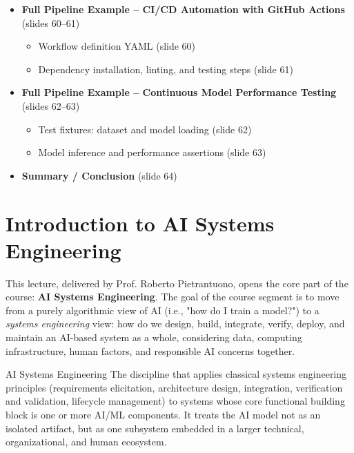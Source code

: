 \begin{itemize}
\begin{itemize}
        \item Ops lifecycle activities: releasing, deploying, monitoring (slide 59)
    \end{itemize}
    \item \textbf{Full Pipeline Example -- CI/CD Automation with GitHub Actions} (slides 60--61)
    \begin{itemize}
        \item Workflow definition YAML (slide 60)
        \item Dependency installation, linting, and testing steps (slide 61)
    \end{itemize}
    \item \textbf{Full Pipeline Example -- Continuous Model Performance Testing} (slides 62--63)
    \begin{itemize}
        \item Test fixtures: dataset and model loading (slide 62)
        \item Model inference and performance assertions (slide 63)
    \end{itemize}
    \item \textbf{Summary / Conclusion} (slide 64)
\end{itemize}

\pagebreak

\section{Introduction to AI Systems Engineering}



This lecture, delivered by Prof. Roberto Pietrantuono, opens the core part of the course: \textbf{AI Systems Engineering}. The goal of the course segment is to move from a purely algorithmic view of AI (i.e., "how do I train a model?") to a \emph{systems engineering} view: how do we design, build, integrate, verify, deploy, and maintain an AI-based system as a whole, considering data, computing infrastructure, human factors, and responsible AI concerns together.

\begin{defbox}{AI Systems Engineering}
The discipline that applies classical systems engineering principles (requirements elicitation, architecture design, integration, verification and validation, lifecycle management) to systems whose core functional building block is one or more AI/ML components. It treats the AI model not as an isolated artifact, but as one subsystem embedded in a larger technical, organizational, and human ecosystem.
\end{defbox}


